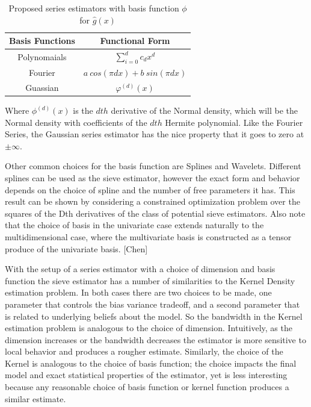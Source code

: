 \documentclass[12pt]{article}  %
\begin{document}
\begin{table}[h]
\begin{center}
\begin{tabular}{|c|c|}
\hline
Basis Functions & Functional Form\\
\hline
Polynomaials & $\sum_{i=0}^{d} c_d x^d$\\
Fourier &$a~cos(\pi d x) + b~sin(\pi d x)$\\
Guassian &$\varphi^{(d)}(x)$\\
\hline
\end{tabular}
\caption {Proposed series estimators with basis function $\phi$ for $\hat{g}(x)$ }
\label{tab:basis}
\end{center}
\end{table}


Where $\phi^{(d)}(x)$ is the $dth$ derivative of the Normal density, which will be the Normal density with coefficients  of the $dth$ Hermite polynomial. Like the Fourier Series, the Gaussian series estimator has the nice property that it goes to zero at $\pm \infty$.


Other common choices for the basis function are Splines and Wavelets.  Different splines can be used as the sieve estimator, however the exact form and behavior depends on the choice of spline and the number of free parameters it has.  This result can be shown by considering a constrained optimization problem over the squares of the Dth derivatives of the class of potential sieve estimators. Also note that the choice of basis in the univariate case extends naturally to the multidimensional case, where the multivariate basis is constructed as a tensor produce of the univariate basis. [Chen]

With the setup of a series estimator with a choice of dimension and basis function the sieve estimator has a number of similarities to the Kernel Density estimation problem.  In both cases there are two choices to be made, one parameter that controls the bias variance tradeoff, and a second parameter that is related to underlying beliefs about the model.  So the bandwidth in the Kernel estimation problem is analogous to the choice of dimension. Intuitively, as the dimension increases or the bandwidth decreases the estimator is more sensitive to local behavior and produces a rougher estimate. Similarly, the choice of the Kernel is analogous to the choice of basis function; the choice impacts the final model and exact statistical properties of the estimator, yet is less interesting because any reasonable choice of basis function or kernel function produces a similar estimate. 
\end{document}
